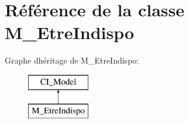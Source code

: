 \hypertarget{class_m___etre_indispo}{}\section{Référence de la classe M\+\_\+\+Etre\+Indispo}
\label{class_m___etre_indispo}
Graphe d\textquotesingle{}héritage de M\+\_\+\+Etre\+Indispo\+:\begin{figure}[H]
\begin{center}
\leavevmode
\includegraphics[height=2.000000cm]{class_m___etre_indispo}
\end{center}
\end{figure}
